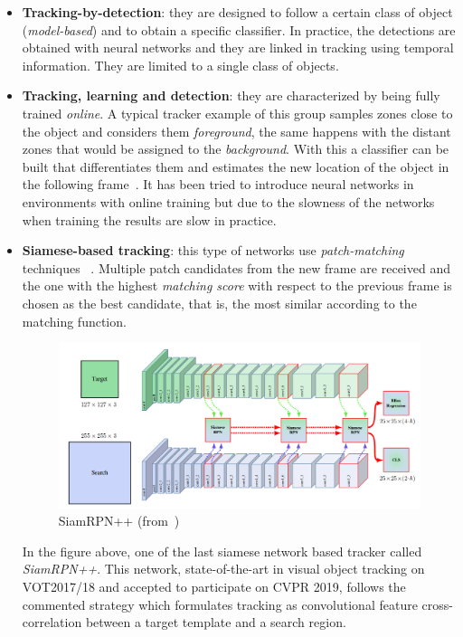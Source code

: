 \begin{itemize}
\item \textbf{Tracking-by-detection}: they are designed to follow a certain class of object (\textit{model-based}) and to obtain a specific classifier. In practice, the detections are obtained with neural networks and they are linked in tracking using temporal information. They are limited to a single class of objects.
\item \textbf{Tracking, learning and detection}: they are characterized by being fully trained \textit{online}. A typical tracker example of this group samples zones close to the object and considers them \textit{foreground}, the same happens with the distant zones that would be assigned to the \textit{background}. With this a classifier can be built that differentiates them and estimates the new location of the object in the following frame~\cite{babenko2009visual}. It has been tried to introduce neural networks in environments with online training but due to the slowness of the networks when training the results are slow in practice.
\item \textbf{Siamese-based tracking}: this type of networks use \textit{patch-matching} techniques ~\cite{tao2016siamese}.   Multiple patch candidates from the new frame are received and the one with the highest \textit{matching score} with respect to the previous frame is chosen as the best candidate, that is, the most similar according to the matching function.
\begin{figure}[H]
\begin{center}
\includegraphics[scale=0.3]{figures/siamese.png}
\caption{SiamRPN++ (from~\cite{li2018siamrpn++})}
\label{fig:pn}
\end{center}
\end{figure}
In the figure above, one of the last siamese network based tracker called \textit{SiamRPN++}. This network, state-of-the-art in visual object tracking on VOT2017/18 and accepted to participate on CVPR 2019, follows the commented strategy which formulates tracking as convolutional feature cross-correlation between a target template and a search region.

\end{itemize}
